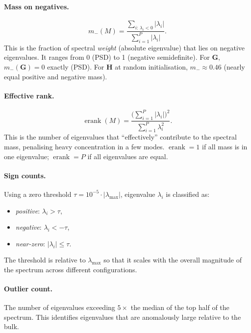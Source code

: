 \documentclass[12pt,a4paper]{article}
\newcommand{\erank}{\operatorname{erank}}
\newcommand{\abs}[1]{\left\lvert #1 \right\rvert}
\newcommand{\bH}{\mathbf{H}}
\newcommand{\bG}{\mathbf{G}}
\begin{document}
\paragraph{Mass on negatives.}
\begin{equation}
  m_-(M)
  = \frac{\sum_{i:\,\lambda_i < 0} \abs{\lambda_i}}
         {\sum_{i=1}^P \abs{\lambda_i}}.
  \label{eq:mass_neg}
\end{equation}
This is the fraction of spectral \emph{weight} (absolute eigenvalue) that
lies on negative eigenvalues.  It ranges from 0 (PSD) to 1 (negative
semidefinite).  For $\bG$, $m_-(\bG) = 0$ exactly (PSD).
For $\bH$ at random initialisation, $m_- \approx 0.46$ (nearly equal
positive and negative mass).

\paragraph{Effective rank.}
\begin{equation}
  \erank(M)
  = \frac{\bigl(\sum_{i=1}^P \abs{\lambda_i}\bigr)^2}
         {\sum_{i=1}^P \lambda_i^2}.
  \label{eq:erank}
\end{equation}
This is the number of eigenvalues that ``effectively'' contribute to the
spectral mass, penalising heavy concentration in a few modes.
$\erank = 1$ if all mass is in one eigenvalue; $\erank = P$ if all
eigenvalues are equal.

\paragraph{Sign counts.}
Using a zero threshold $\tau = 10^{-5} \cdot \abs{\lambda_{\max}}$,
eigenvalue $\lambda_i$ is classified as:
\begin{itemize}
  \item \emph{positive}: $\lambda_i > \tau$,
  \item \emph{negative}: $\lambda_i < -\tau$,
  \item \emph{near-zero}: $\abs{\lambda_i} \leq \tau$.
\end{itemize}
The threshold is relative to $\lambda_{\max}$ so that it scales with the
overall magnitude of the spectrum across different configurations.

\paragraph{Outlier count.}
The number of eigenvalues exceeding $5\times$ the median of the top half of
the spectrum.  This identifies eigenvalues that are anomalously
large relative to the bulk.
\end{document}
